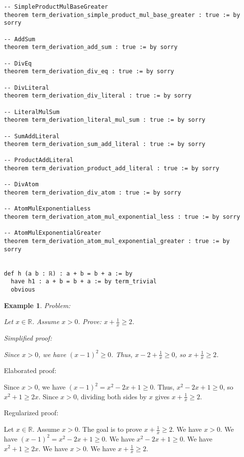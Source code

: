 \documentclass{article}
\newtheorem{example}{Example}
\begin{document}
\begin{tcolorbox}[colback=white!10, width=\linewidth]
\begin{lstlisting}[language=Lean4]
-- SimpleProductMulBaseGreater
theorem term_derivation_simple_product_mul_base_greater : true := by sorry

-- AddSum
theorem term_derivation_add_sum : true := by sorry

-- DivEq
theorem term_derivation_div_eq : true := by sorry

-- DivLiteral
theorem term_derivation_div_literal : true := by sorry

-- LiteralMulSum
theorem term_derivation_literal_mul_sum : true := by sorry

-- SumAddLiteral
theorem term_derivation_sum_add_literal : true := by sorry

-- ProductAddLiteral
theorem term_derivation_product_add_literal : true := by sorry

-- DivAtom
theorem term_derivation_div_atom : true := by sorry

-- AtomMulExponentialLess
theorem term_derivation_atom_mul_exponential_less : true := by sorry

-- AtomMulExponentialGreater
theorem term_derivation_atom_mul_exponential_greater : true := by sorry


def h (a b : ℝ) : a + b = b + a := by
  have h1 : a + b = b + a := by term_trivial
  obvious

\end{lstlisting}
\end{tcolorbox}


\begin{example}
Problem:
\begin{tcolorbox}[colback=yellow!10, width=\linewidth]
Let $x\in\mathbb{R}$. Assume $x> 0$. Prove: $x + \frac{1}{x} \ge 2$.
\end{tcolorbox}

Simplified proof:
\begin{tcolorbox}[colback=blue!10, width=\linewidth]
Since $x>0$, we have $(x-1)^2 \ge 0$. Thus, $x - 2 + \frac{1}{x} \ge 0$, so $x + \frac{1}{x} \ge 2$.
\end{tcolorbox}
\end{example}

Elaborated proof:
\begin{tcolorbox}[colback=green!10, width=\linewidth]
Since $x>0$, we have $(x-1)^2 = x^2 - 2x + 1 \ge 0$. Thus, $x^2 - 2x + 1 \ge 0$, so $x^2 + 1 \ge 2x$. Since $x > 0$, dividing both sides by $x$ gives $x + \frac{1}{x} \ge 2$.
\end{tcolorbox}

Regularized proof:
\begin{tcolorbox}[colback=red!10, width=\linewidth]
Let $x\in\mathbb{R}$.
Assume $x>0$.
The goal is to prove $x + \frac{1}{x} \ge 2$.
We have $x>0$.
We have ${{(x-1)}}^2 = x^2 - 2x + 1 \ge 0$.
We have $x^2 - 2x + 1 \ge 0$.
We have $x^2 + 1 \ge 2x$.
We have $x > 0$.
We have $x + \frac{1}{x} \ge 2$.
\end{tcolorbox}
\end{document}
